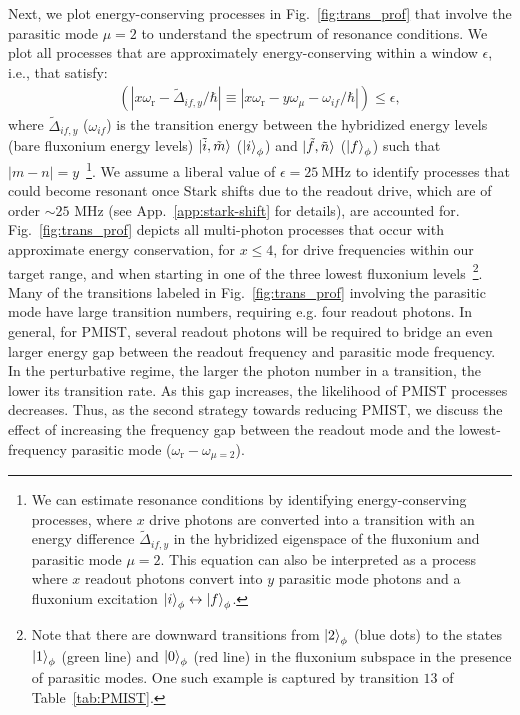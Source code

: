 \documentclass[%
reprint,
superscriptaddress,
 amsmath,amssymb,
 aps,
 prx,
longbibliography,
floatfix,
]{revtex4-2}
\begin{document}
Next, we plot energy-conserving processes in Fig.~\ref{fig:trans_prof} that involve the parasitic mode $\mu=2$ to understand the spectrum of resonance conditions. We plot all processes that are approximately energy-conserving within a window $\epsilon$, i.e., that satisfy:
\begin{align}
\left(
    |x\omega_\textrm{r}-\tilde{\Delta}_{if,y}/\hbar| \equiv 
|x\omega_\textrm{r}-y\omega_\mu-\omega_{if} /\hbar| \right) \le \epsilon,
\label{eq:En_cons}
\end{align}
where $\tilde{\Delta}_{if,y}$ ($\omega_{if} $) is the transition energy between the hybridized energy levels (bare fluxonium energy levels) $\ket{\tilde{i},\tilde{m}}$ ($\ket{i}_\phi$) and $\ket{\tilde{f},\tilde{n}}$ ($\ket{f}_\phi$) such that $|m-n|=y$~\footnote{We can estimate resonance conditions by identifying energy-conserving processes, where $x$ drive photons are converted into a transition with an energy difference $\tilde{\Delta}_{if,y}$ in the hybridized eigenspace of the fluxonium and parasitic mode $\mu=2$. This equation can also be interpreted as a process where $x$ readout photons convert into $y$ parasitic mode photons and a fluxonium excitation $\ket{i}_\phi \leftrightarrow \ket{f}_\phi$.}.
We assume a liberal value of $\epsilon = 25 \ \textrm{MHz}$ to identify processes that could become resonant once Stark shifts due to the readout drive, which are of order $\sim 25$ MHz (see App.~\ref{app:stark-shift} for details), are accounted for. Fig.~\ref{fig:trans_prof} depicts all multi-photon processes that occur with approximate energy conservation, for $x \leq 4$, for drive frequencies within our target range, and when starting in one of the three lowest fluxonium levels~\footnote{Note that there are downward transitions from $\ket{2}_\phi$ (blue dots) to the states $\ket{1}_\phi$ (green line) and $\ket{0}_\phi$ (red line) in the fluxonium subspace in the presence of parasitic modes. One such example is captured by transition $13$ of Table~\ref{tab:PMIST}.}. Many of the transitions labeled in Fig.~\ref{fig:trans_prof} involving the parasitic mode have large transition numbers, requiring e.g. four readout photons. In general, for PMIST, several readout photons will be required to bridge an even larger energy gap between the readout frequency and parasitic mode frequency. In the perturbative regime, the larger the photon number in a transition, the lower its transition rate. As this gap increases, the likelihood of PMIST processes decreases. Thus, as the second strategy towards reducing PMIST, we discuss the effect of increasing the frequency gap between the readout mode and the lowest-frequency parasitic mode ($\omega_\textrm{r}-\omega_{\mu=2}$).
\end{document}
